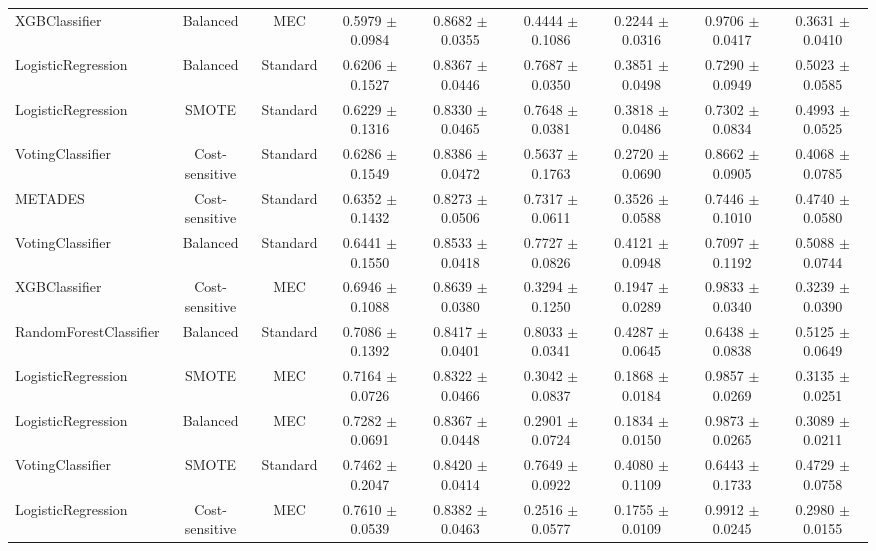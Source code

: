 \documentclass[conference]{IEEEtran}
\begin{document}
\begin{table}[h]
\begin{threeparttable}
{\begin{tabular}{lcc|cccccc}
            XGBClassifier & Balanced & MEC & 0.5979 $\pm$ 0.0984 & 0.8682 $\pm$ 0.0355 & 0.4444 $\pm$ 0.1086 & 0.2244 $\pm$ 0.0316 & 0.9706 $\pm$ 0.0417 & 0.3631 $\pm$ 0.0410 \\
            LogisticRegression & Balanced & Standard & 0.6206 $\pm$ 0.1527 & 0.8367 $\pm$ 0.0446 & 0.7687 $\pm$ 0.0350 & 0.3851 $\pm$ 0.0498 & 0.7290 $\pm$ 0.0949 & 0.5023 $\pm$ 0.0585 \\
            LogisticRegression & SMOTE & Standard & 0.6229 $\pm$ 0.1316 & 0.8330 $\pm$ 0.0465 & 0.7648 $\pm$ 0.0381 & 0.3818 $\pm$ 0.0486 & 0.7302 $\pm$ 0.0834 & 0.4993 $\pm$ 0.0525 \\
            VotingClassifier & Cost-sensitive & Standard & 0.6286 $\pm$ 0.1549 & 0.8386 $\pm$ 0.0472 & 0.5637 $\pm$ 0.1763 & 0.2720 $\pm$ 0.0690 & 0.8662 $\pm$ 0.0905 & 0.4068 $\pm$ 0.0785 \\
            METADES & Cost-sensitive & Standard & 0.6352 $\pm$ 0.1432 & 0.8273 $\pm$ 0.0506 & 0.7317 $\pm$ 0.0611 & 0.3526 $\pm$ 0.0588 & 0.7446 $\pm$ 0.1010 & 0.4740 $\pm$ 0.0580 \\
            VotingClassifier & Balanced & Standard & 0.6441 $\pm$ 0.1550 & 0.8533 $\pm$ 0.0418 & 0.7727 $\pm$ 0.0826 & 0.4121 $\pm$ 0.0948 & 0.7097 $\pm$ 0.1192 & 0.5088 $\pm$ 0.0744 \\
            XGBClassifier & Cost-sensitive & MEC & 0.6946 $\pm$ 0.1088 & 0.8639 $\pm$ 0.0380 & 0.3294 $\pm$ 0.1250 & 0.1947 $\pm$ 0.0289 & 0.9833 $\pm$ 0.0340 & 0.3239 $\pm$ 0.0390 \\
            RandomForestClassifier & Balanced & Standard & 0.7086 $\pm$ 0.1392 & 0.8417 $\pm$ 0.0401 & 0.8033 $\pm$ 0.0341 & 0.4287 $\pm$ 0.0645 & 0.6438 $\pm$ 0.0838 & 0.5125 $\pm$ 0.0649 \\
            LogisticRegression & SMOTE & MEC & 0.7164 $\pm$ 0.0726 & 0.8322 $\pm$ 0.0466 & 0.3042 $\pm$ 0.0837 & 0.1868 $\pm$ 0.0184 & 0.9857 $\pm$ 0.0269 & 0.3135 $\pm$ 0.0251 \\
            LogisticRegression & Balanced & MEC & 0.7282 $\pm$ 0.0691 & 0.8367 $\pm$ 0.0448 & 0.2901 $\pm$ 0.0724 & 0.1834 $\pm$ 0.0150 & 0.9873 $\pm$ 0.0265 & 0.3089 $\pm$ 0.0211 \\
            VotingClassifier & SMOTE & Standard & 0.7462 $\pm$ 0.2047 & 0.8420 $\pm$ 0.0414 & 0.7649 $\pm$ 0.0922 & 0.4080 $\pm$ 0.1109 & 0.6443 $\pm$ 0.1733 & 0.4729 $\pm$ 0.0758 \\
            LogisticRegression & Cost-sensitive & MEC & 0.7610 $\pm$ 0.0539 & 0.8382 $\pm$ 0.0463 & 0.2516 $\pm$ 0.0577 & 0.1755 $\pm$ 0.0109 & 0.9912 $\pm$ 0.0245 & 0.2980 $\pm$ 0.0155 \\

\end{tabular}}
\end{threeparttable}
\end{table}
\end{document}
